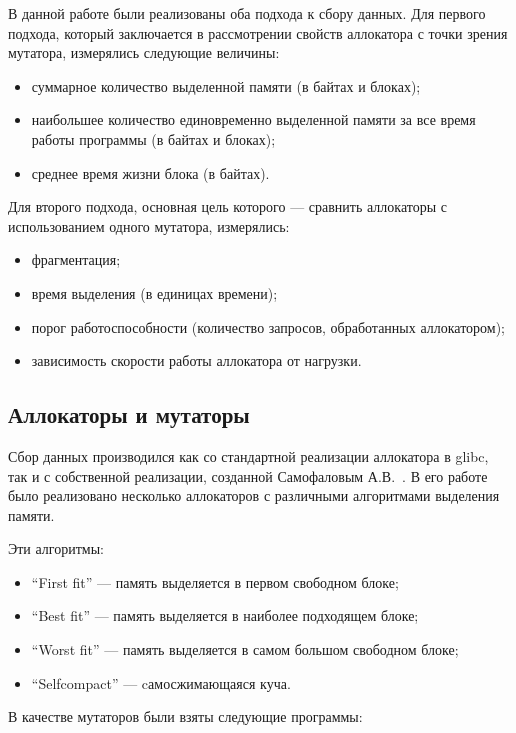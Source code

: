 В данной работе были реализованы оба подхода к сбору данных. Для первого подхода, который заключается в рассмотрении свойств 
аллокатора с точки зрения мутатора, измерялись следующие величины:

\begin{itemize}
\item суммарное количество выделенной памяти (в байтах и блоках);
\item наибольшее количество единовременно выделенной памяти за все время работы программы (в байтах и блоках);
\item среднее время жизни блока (в байтах).
\end{itemize}
      
Для второго подхода, основная цель которого --- сравнить аллокаторы с использованием одного мутатора, 
измерялись:

\begin{itemize}
\item фрагментация; 
\item время выделения (в единицах времени);
\item порог работоспособности (количество запросов, обработанных аллокатором);
\item зависимость скорости работы аллокатора от нагрузки.
\end{itemize}
      
\subsection{Аллокаторы и мутаторы}
   
Сбор данных производился как со стандартной реализации аллокатора в glibc, так и с собственной реализации,
созданной Самофаловым А.В.~\cite{samofal}. В его работе было реализовано несколько аллокаторов с различными алгоритмами
выделения памяти.
   
Эти алгоритмы:

\begin{itemize}
\item ``First fit'' --- память выделяется в первом свободном блоке;
\item ``Best fit'' --- память выделяется в наиболее подходящем блоке;
\item ``Worst fit'' --- память выделяется в самом большом свободном блоке;
\item ``Selfcompact'' --- cамосжимающаяся куча.
\end{itemize}
   
В качестве мутаторов были взяты следующие программы:

